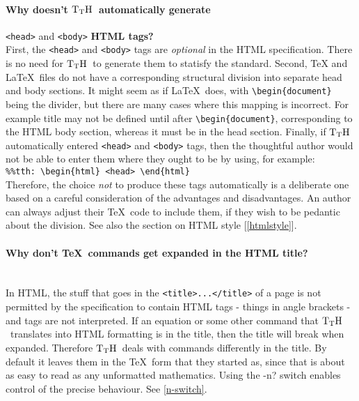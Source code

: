\documentclass[12pt]{article}
\def\TtH{$\rm{}T_TH$}
\begin{document}
\paragraph{Why doesn't \TtH\ automatically generate} \verb!<head>!
and \verb!<body>! \textbf{HTML tags?}\leavevmode\\
 First, the \verb!<head>! and
\verb!<body>! tags are \emph{optional} in the HTML specification. There is
no need for \TtH\ to generate them to statisfy the standard. Second, \TeX
and \LaTeX\ files do not have a corresponding structural division into
separate head and body sections. It might seem as if \LaTeX\ does, with
\verb!\begin{document}!  being the divider, but there are many cases
where this mapping is incorrect. For example title may not be defined
until after \verb!\begin{document}!, corresponding to the HTML body
section, whereas it must be in the head section. Finally, if \TtH
automatically entered \verb!<head>! and \verb!<body>! tags, then the
thoughtful author would not be able to enter them where they ought to
be by using, for example:\leavevmode\\
\verb!%%tth: \begin{html} <head> \end{html}!\leavevmode\\
Therefore, the choice \emph{not} to produce these tags automatically
is a deliberate one based on a careful consideration of the advantages
and disadvantages. An author can always adjust their \TeX\ code to
include them, if they wish to be pedantic about the division. See also
the section on HTML style [\ref{htmlstyle}].

\paragraph{Why don't \TeX\ commands get expanded in the HTML title?}\leavevmode\\
In HTML, the stuff that goes in the \verb|<title>...</title>| of a
page is not permitted by the specification to contain HTML tags -
things in angle brackets - and tags are not interpreted. If an
equation or some other command that \TtH\ translates into HTML
formatting is in the title, then the title will break when
expanded. Therefore \TtH\ deals with commands differently in the
title.  By default it leaves them in the \TeX\ form that they started
as, since that is about as easy to read as any unformatted
mathematics. Using the -n? switch enables control of the precise
behaviour. See \ref{n-switch}.
\end{document}
